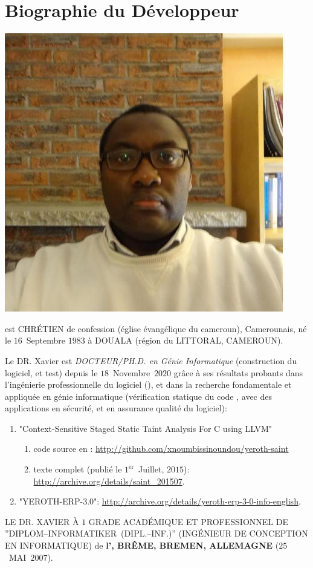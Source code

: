 \section{Biographie du Développeur}\label{chap:biographie}
\vspace{-0.9em}

\begin{center}
\includegraphics[scale=0.32]{../../francais/images/XavierNOUNDOU-2}
\end{center}

\textbf{\myfullacademicname} est CHRÉTIEN de confession
(église évangélique du cameroun),
Camerounais, né le $16$~Septembre $1983$ à
DOUALA (région du LITTORAL, CAMEROUN).

Le DR. Xavier est \textit{DOCTEUR/PH.D. en Génie Informatique}
(construction du logiciel, et test) depuis le $18$~Novembre~$2020$
grâce à ses résultats probants dans l'ingénierie
professionnelle du logiciel (\yerotherpblack), et dans la recherche
fondamentale et appliquée en génie informatique
(vérification statique du code \cplusplus, avec des applications
en sécurité, et en assurance qualité du logiciel):

\begin{enumerate}
	\item "Context-Sensitive Staged Static Taint Analysis
			For C using LLVM"
		\begin{enumerate}[1.]
			\itemsep -0.7em
			\item code source en \cplusplus: \url{http://github.com/xnoumbissinoundou/yeroth-saint}
			\item texte complet (publié le $1^\text{er}$~Juillet, $2015$): \url{http://archive.org/details/saint_201507}.
		\end{enumerate}		 

	\item "YEROTH-ERP-3.0": \url{http://archive.org/details/yeroth-erp-3-0-info-english}.\\
\end{enumerate}


LE DR. XAVIER À $1$ GRADE ACADÉMIQUE ET PROFESSIONNEL
DE ''DIPLOM--INFORMATIKER~(DIPL.--INF.)''
(INGÉNIEUR DE CONCEPTION EN INFORMATIQUE) de
\textbf{l'\bremenu, BRÊME, BREMEN, ALLEMAGNE}
($25$~MAI~$2007$).

